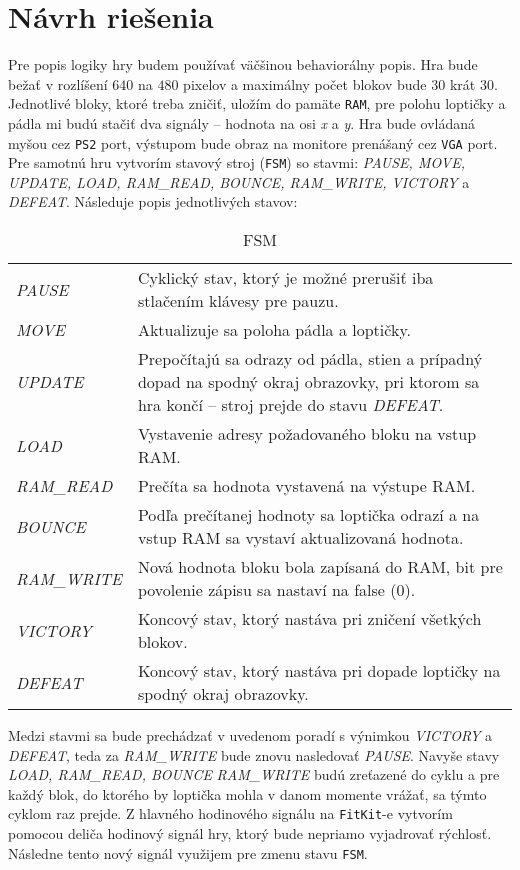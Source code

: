 \documentclass[12pt,a4paper,titlepage,final]{article}
\begin{document}
\section{Návrh riešenia} \label{navrh}
Pre popis logiky hry budem používať väčšinou behaviorálny popis. Hra bude bežať v rozlíšení $640$ na $480$ pixelov a
maximálny počet blokov bude $30$ krát $30$. Jednotlivé bloky, ktoré treba zničiť, uložím
do pamäte \texttt{RAM}, pre polohu loptičky a pádla mi budú stačiť dva signály -- hodnota na osi \emph{x} a \emph{y}.
Hra bude ovládaná myšou cez \texttt{PS2} port, výstupom bude obraz na monitore prenášaný cez \texttt{VGA} port.
Pre samotnú hru vytvorím stavový stroj (\texttt{FSM}) so stavmi: \emph{PAUSE, MOVE, UPDATE, LOAD, RAM\_READ, BOUNCE, RAM\_WRITE, 
VICTORY} a \emph{DEFEAT}. Následuje popis jednotlivých stavov:
\begin{table}[H]
\begin{tabularx}{\linewidth}{ l X } 
\emph{PAUSE} & Cyklický stav, ktorý je možné prerušiť iba stlačením klávesy pre pauzu. \\
\emph{MOVE} & Aktualizuje sa poloha pádla a loptičky. \\
\emph{UPDATE} & Prepočítajú sa odrazy od pádla, stien a prípadný dopad na spodný okraj obrazovky, 
		 pri ktorom sa hra končí -- stroj prejde do stavu \emph{DEFEAT}.\\
\emph{LOAD} & Vystavenie adresy požadovaného bloku na vstup RAM. \\
\emph{RAM\_READ} & Prečíta sa hodnota vystavená na výstupe RAM. \\
\emph{BOUNCE} & Podľa prečítanej hodnoty sa loptička odrazí a na vstup RAM sa vystaví aktualizovaná hodnota. \\
\emph{RAM\_WRITE} & Nová hodnota bloku bola zapísaná do RAM, bit pre povolenie zápisu sa nastaví na false (0). \\
\emph{VICTORY} & Koncový stav, ktorý nastáva pri zničení všetkých blokov. \\
\emph{DEFEAT} & Koncový stav, ktorý nastáva pri dopade loptičky na spodný okraj obrazovky.
\end{tabularx}
\caption{FSM}
\label{FSM}
\end{table}
Medzi stavmi sa bude prechádzať v uvedenom poradí s výnimkou \emph{VICTORY} a \emph{DEFEAT}, teda za \emph{RAM\_WRITE} bude znovu
nasledovať \emph{PAUSE}. 
Navyše stavy \emph{LOAD, RAM\_READ, BOUNCE} \emph{RAM\_WRITE} budú zreťazené do cyklu a pre každý blok, do ktorého by loptička
mohla v danom momente vrážať, sa týmto cyklom raz prejde.  
Z hlavného hodinového signálu na \texttt{FitKit}-e vytvorím pomocou deliča hodinový signál hry, ktorý bude
nepriamo vyjadrovať rýchlosť. Následne tento nový signál využijem pre zmenu stavu \texttt{FSM}. 
\end{document}
